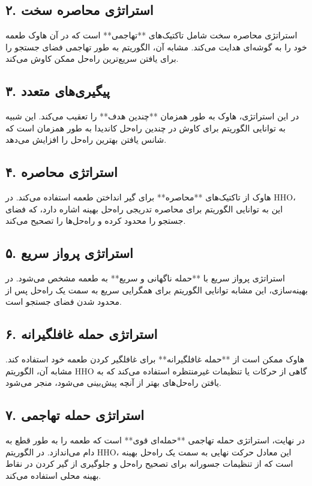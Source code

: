 \documentclass{article}
\begin{document}
\subsection*{۲. استراتژی محاصره سخت}
استراتژی محاصره سخت شامل تاکتیک‌های **تهاجمی** است که در آن هاوک طعمه خود را به گوشه‌ای هدایت می‌کند. مشابه آن، الگوریتم به طور تهاجمی فضای جستجو را برای یافتن سریع‌ترین راه‌حل ممکن کاوش می‌کند.

\subsection*{۳. پیگیری‌های متعدد}
در این استراتژی، هاوک به طور همزمان **چندین هدف** را تعقیب می‌کند. این شبیه به توانایی الگوریتم برای کاوش در چندین راه‌حل کاندیدا به طور همزمان است که شانس یافتن بهترین راه‌حل را افزایش می‌دهد.

\subsection*{۴. استراتژی محاصره}
هاوک از تاکتیک‌های **محاصره** برای گیر انداختن طعمه استفاده می‌کند. در HHO، این به توانایی الگوریتم برای محاصره تدریجی راه‌حل بهینه اشاره دارد، که فضای جستجو را محدود کرده و راه‌حل‌ها را تصحیح می‌کند.

\subsection*{۵. استراتژی پرواز سریع}
استراتژی پرواز سریع با **حمله ناگهانی و سریع** به طعمه مشخص می‌شود. در بهینه‌سازی، این مشابه توانایی الگوریتم برای همگرایی سریع به سمت یک راه‌حل پس از محدود شدن فضای جستجو است.

\subsection*{۶. استراتژی حمله غافلگیرانه}
هاوک ممکن است از **حمله غافلگیرانه** برای غافلگیر کردن طعمه خود استفاده کند. مشابه آن، الگوریتم HHO گاهی از حرکات یا تنظیمات غیرمنتظره استفاده می‌کند که به یافتن راه‌حل‌های بهتر از آنچه پیش‌بینی می‌شود، منجر می‌شود.

\subsection*{۷. استراتژی حمله تهاجمی}
در نهایت، استراتژی حمله تهاجمی **حمله‌ای قوی** است که طعمه را به طور قطع به دام می‌اندازد. در الگوریتم HHO، این معادل حرکت نهایی به سمت یک راه‌حل بهینه است که از تنظیمات جسورانه برای تصحیح راه‌حل و جلوگیری از گیر کردن در نقاط بهینه محلی استفاده می‌کند.
\end{document}
